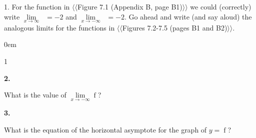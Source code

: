 \documentclass[12pt,]{book}
\theoremstyle{plain}
\theoremstyle{definition}
\numberwithin{equation}{section}
\newcommand{\hrulemedium}{\noalign{\hrule height 0.07em}}
\newcommand{\hrulethick} {\noalign{\hrule height 0.11em}}
\newcounter{figstack}
\newcounter{figindex}
\newlength\fight
\newcommand\pushValignCaptionBottom[5][b]{%
\stepcounter{figstack}%
\expandafter\def\csname %
figalign\romannumeral\value{figstack}\endcsname{#1}%
\expandafter\def\csname %
figtype\romannumeral\value{figstack}\endcsname{#2}%
\expandafter\def\csname %
figwd\romannumeral\value{figstack}\endcsname{#3}%
\expandafter\def\csname %
figcontent\romannumeral\value{figstack}\endcsname{#4}%
\expandafter\def\csname %
figcap\romannumeral\value{figstack}\endcsname{#5}%
\setbox0=\hbox{%
\begin{#2}{#3}#4\end{#2}}%
\ifdim\dimexpr\ht0+\dp0\relax>\fight\global\setlength{\fight}{%
\dimexpr\ht0+\dp0\relax}\fi%
}
\newcommand\popValignCaptionBottom{%
\setcounter{figindex}{0}%
\hfill%
\whiledo{\value{figindex}<\value{figstack}}{%
\stepcounter{figindex}%
\def\tmp{\csname figwd\romannumeral\value{figindex}\endcsname}%
\begin{\csname figtype\romannumeral\value{figindex}\endcsname}[t]{\tmp}%
\centering%
\stackinset{c}{}%
{\csname figalign\romannumeral\value{figindex}\endcsname}{}%
{\csname figcontent\romannumeral\value{figindex}\endcsname}%
{\rule{0pt}{\fight}}\par%
\csname figcap\romannumeral\value{figindex}\endcsname%
\end{\csname figtype\romannumeral\value{figindex}\endcsname}%
\hfill%
}%
\setcounter{figstack}{0}%
\setlength{\fight}{0pt}%
\hfill%
}
\newenvironment{exercisegroup}%
{\medskip\noindent}%
{\par\bigskip}%
\newlength{\exercisegroupindent}%
\newlength{\exercisegroupitemwidth}%
\newenvironment{exercisegrouplist}%
{\vspace{-\partopsep}%
\begin{adjustwidth}{\exercisegroupindent}{0em}}%
{\end{adjustwidth}%
\vspace{-\partopsep}%
\vspace{\baselineskip}}%
\newenvironment{exercisegroupbycol}[1]%
{\begin{exercisegrouplist}%
\vspace{-\multicolsep}%
\begin{multicols}{#1}%
\setlength{\parindent}{0em}%
\setlength{\exercisegroupitemwidth}{\linewidth}}%
{\end{multicols}%
\vspace{-\multicolsep}%
\end{exercisegrouplist}}%
\newenvironment{exercisegroupitem}[1]%
{\begin{minipage}[t]{\exercisegroupitemwidth}
\vspace{0pt}%
{\bfseries#1}%
\rule{0pt}{\baselineskip}}{\strut%
\end{minipage}%
\hspace{\columnsep}}%
\providecommand\phantomsection{}
\newcommand{\fe}[2]{\mathop{{#1}{\left(#2\right)}}}
\begin{document}
\begin{exerciselist}
\item[1.]\phantomsection\hypertarget{exercise-79}{\null}For the function in {$\langle\langle$Figure 7.1 (Appendix B, page B1)$\rangle\rangle$} we could (correctly) write \(\lim\limits_{x\to\infty}\fe{f_1}{x}=-2\) and \(\lim\limits_{x\to-\infty}\fe{f_1}{x}=-2\). Go ahead and write (and say aloud) the analogous limits for the functions in {$\langle\langle$Figures 7.2-7.5 (pages B1 and B2)$\rangle\rangle$}.%
\par\smallskip
\end{exerciselist}
\begin{exercisegroup}%
\par
\begin{exercisegroupbycol}{1}%
\begin{exercisegroupitem}{2. }\phantomsection\hypertarget{exercise-80}{\null}
What is the value of \(\lim\limits_{x\to-\infty}\fe{f}{x}\)?%
\end{exercisegroupitem}%
\par%
\begin{exercisegroupitem}{3. }\phantomsection\hypertarget{exercise-81}{\null}
What is the equation of the horizontal asymptote for the graph of \(y=\fe{f}{x}\)?%
\end{exercisegroupitem}%
\par%
\end{exercisegroupbycol}%
\end{exercisegroup}%
\end{document}
